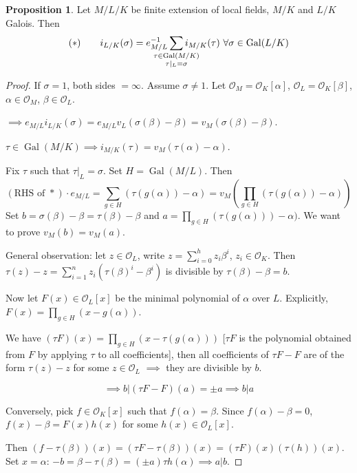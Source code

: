 \documentclass[a4paper]{article}
\theoremstyle{definition}
\theoremstyle{default}
\newtheorem{prop}[definition]{Proposition}
\theoremstyle{remark}
\DeclareMathOperator{\Gal}{Gal}
\begin{document}
\begin{prop}
	Let $M/L/K$ be finite extension of local fields,
	$M/K$ and $L/K$ Galois.
	Then
	$$(*) \qquad i_{L/K}(\sigma) = e_{M/L}^{-1} \sum_{\mathclap{\substack{\tau \in \Gal(M/K) \\ \tau|_L = \sigma}}} i_{M/K}(\tau) \ \forall \sigma \in \Gal(L/K)$$
	\label{87}
\end{prop}
\begin{proof}
	If $\sigma = 1$, both sides $= \infty$. Assume $\sigma \neq 1$.
	Let $\mathcal{O}_M = \mathcal{O}_K[\alpha]$, 
	$\mathcal{O}_L = \mathcal{O}_K[\beta]$,
	$\alpha \in \mathcal{O}_M$, 
	$\beta \in \mathcal{O}_L$.
	
	$\implies e_{M/L}i_{L/K}(\sigma) = e_{M/L} v_L(\sigma(\beta)-\beta) = v_M(\sigma(\beta)-\beta)$.
	
	$\tau \in \Gal(M/K) \implies i_{M/K}(\tau) = v_M(\tau(\alpha) - \alpha)$.
	
	Fix $\tau$ such that $\tau|_L = \sigma$.
	Set $H = \Gal(M/L)$. Then
	$$(\text{RHS of } *)\cdot e_{M/L} = \sum_{g \in H}(\tau(g(\alpha)) - \alpha) = v_M(\prod_{g \in H}(\tau(g(\alpha)) - \alpha))$$
	Set $b=\sigma(\beta)-\beta = \tau(\beta) - \beta$
	and $a = \prod_{g \in H}(\tau(g(\alpha))) - \alpha)$.
	We want to prove $v_M(b) = v_M(a)$.
	
	General observation:
	let $z \in \mathcal{O}_L$,
	write $z = \sum_{i=0}^h z_i \beta^i$, $z_i \in \mathcal{O}_K$.
	Then $\tau(z)-z = \sum_{i=1}^n z_i(\tau(\beta)^i-\beta^i)$ is divisible by $\tau(\beta)-\beta = b$.
	
	Now let $F(x) \in \mathcal{O}_L[x]$ be the minimal polynomial of $\alpha$ over $L$.
	Explicitly, $F(x) = \prod_{g \in H}(x - g(\alpha))$.
	
	We have $(\tau F)(x) = \prod_{g \in H}(x - \tau(g(\alpha)))$
	[$\tau F$ is the polynomial obtained from $F$ by applying $\tau$ to all coefficients],
	then all coefficients of $\tau F - F$ are of the form $\tau(z) - z$ for some $z \in \mathcal{O}_L$
	$\implies$ they are divisible by $b$.
	
	$$\implies b | (\tau F -F)(a) = \pm a \implies b | a$$
	
	Conversely, pick $f \in \mathcal{O}_K[x]$ such that $f(\alpha) = \beta$.
	Since $f(\alpha) - \beta = 0$,
	$f(x) - \beta = F(x)h(x)$ for some $h(x) \in \mathcal{O}_L[x]$.
	
	Then $(f-\tau(\beta))(x) = (\tau F - \tau(\beta))(x) = (\tau F)(x)(\tau(h))(x)$.
	Set $x = \alpha$: $-b = \beta - \tau(\beta) = (\pm a)\tau h(\alpha) \implies a | b$.
\end{proof}
\end{document}
